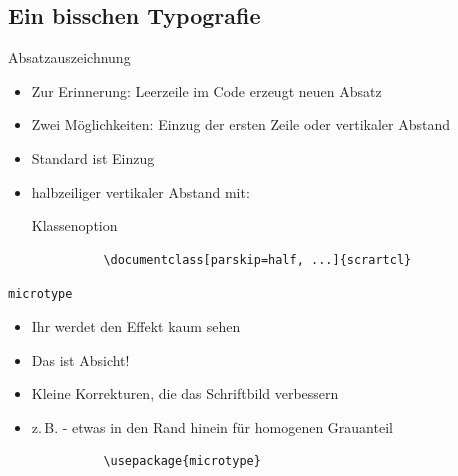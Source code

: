 \subsection{Ein bisschen Typografie}
\begin{frame}[fragile]{Absatzauszeichnung}
  \begin{itemize}
    \item Zur Erinnerung: Leerzeile im Code erzeugt neuen Absatz
    \item Zwei Möglichkeiten: Einzug der ersten Zeile oder vertikaler Abstand
    \item Standard ist Einzug
    \item halbzeiliger vertikaler Abstand mit:
      \begin{block}{Klassenoption}
        \begin{lstlisting}
          \documentclass[parskip=half, ...]{scrartcl}
        \end{lstlisting}
      \end{block}
  \end{itemize}
\end{frame}

\begin{frame}[fragile]{\texttt{microtype}}
  \begin{itemize}
    \item Ihr werdet den Effekt kaum sehen
    \item Das ist Absicht!
    \item Kleine Korrekturen, die das Schriftbild verbessern
    \item z.\,B. - etwas in den Rand hinein für homogenen Grauanteil
      \begin{Packages}
        \begin{lstlisting}
          \usepackage{microtype}
        \end{lstlisting}
      \end{Packages}
  \end{itemize}
\end{frame}

